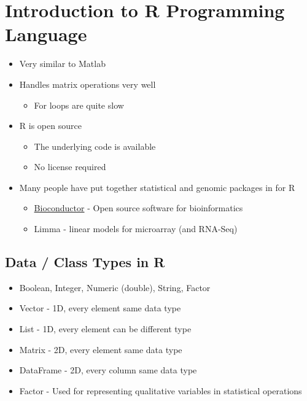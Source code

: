 \documentclass[10pt]{article}
\begin{document}
\section*{Introduction to R Programming Language}
\begin{itemize}
	\item Very similar to Matlab
	\item Handles matrix operations very well
	\begin{itemize}
	    \item For loops are quite slow
    \end{itemize}
    \item R is open source
    \begin{itemize}
	    \item The underlying code is available
	    \item No license required
    \end{itemize}
    \item Many people have put together statistical and genomic packages in for R
    \begin{itemize}
	    \item \href{http://bioconductor.org/}{Bioconductor} - Open source software for bioinformatics
	    \item Limma - linear models for microarray (and RNA-Seq)
    \end{itemize}
\end{itemize}

\subsection*{Data / Class Types in R}
\begin{itemize}
	\item Boolean, Integer, Numeric (double), String, Factor
	\item Vector - 1D, every element same data type
	\item List - 1D, every element can be different type
	\item Matrix - 2D, every element same data type
	\item DataFrame - 2D, every column same data type
	\item Factor - Used for representing qualitative variables in statistical operations
\end{itemize}
\end{document}
